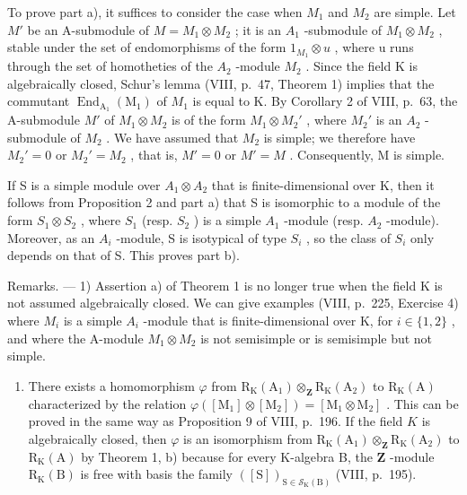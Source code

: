 To prove part a), it suffices to consider the case when \(M_{1}\) and \(M_{2}\) are simple. Let \(M'\) be an A-submodule of \(M = M_{1} \otimes M_{2}\) ; it is an \(A_{1}\) -submodule of \(M_{1} \otimes M_{2}\) , stable under the set of endomorphisms of the form \(1_{M_{1}} \otimes u\) , where u runs through the set of homotheties of the \(A_{2}\) -module \(M_{2}\) . Since the field K is algebraically closed, Schur's lemma (VIII, p.~47, Theorem 1) implies that the commutant \(\operatorname{End}_{\mathrm{A}_{1}}(\mathrm{M}_{1})\) of \(M_{1}\) is equal to K. By Corollary 2 of VIII, p.~63, the A-submodule \(M'\) of \(M_{1} \otimes M_{2}\) is of the form \(M_{1} \otimes M_{2}'\) , where \(M_{2}'\) is an \(A_{2}\) -submodule of \(M_{2}\) . We have assumed that \(M_{2}\) is simple; we therefore have \(M_{2}' = 0\) or \(M_{2}' = M_{2}\) , that is, \(M' = 0\) or \(M' = M\) . Consequently, M is simple.

If S is a simple module over \(A_{1} \otimes A_{2}\) that is finite-dimensional over K, then it follows from Proposition 2 and part a) that S is isomorphic to a module of the form \(S_{1} \otimes S_{2}\) , where \(S_{1}\) (resp. \(S_{2}\) ) is a simple \(A_{1}\) -module (resp. \(A_{2}\) -module). Moreover, as an \(A_{i}\) -module, S is isotypical of type \(S_{i}\) , so the class of \(S_{i}\) only depends on that of S. This proves part b).

Remarks. --- 1) Assertion a) of Theorem 1 is no longer true when the field K is not assumed algebraically closed. We can give examples (VIII, p.~225, Exercise 4) where \(M_{i}\) is a simple \(A_{i}\) -module that is finite-dimensional over K, for \(i \in \{1, 2\}\) , and where the A-module \(M_{1} \otimes M_{2}\) is not semisimple or is semisimple but not simple.

\begin{enumerate}
\def\labelenumi{\arabic{enumi})}
\setcounter{enumi}{1}
\tightlist
\item
  There exists a homomorphism \(\varphi\) from \(\mathrm{R_K(A_1)\otimes_{\mathbf{Z}} R_K(A_2)}\) to \(\mathrm{R_K(A)}\) characterized by the relation \(\varphi ([\mathrm{M}_1]\otimes [\mathrm{M}_2]) = [\mathrm{M}_1\otimes \mathrm{M}_2]\) . This can be proved in the same way as Proposition 9 of VIII, p.~196. If the field \(K\) is algebraically closed, then \(\varphi\) is an isomorphism from \(\mathrm{R_K(A_1)\otimes_{\mathbf{Z}} R_K(A_2)}\) to \(\mathrm{R_K(A)}\) by Theorem 1, b) because for every K-algebra B, the \(\mathbf{Z}\) -module \(\mathrm{R_K(B)}\) is free with basis the family \(([\mathrm{S}])_{\mathrm{S}\in \mathcal{S}_{\mathrm{K}}(\mathrm{B})}\) (VIII, p.~195).
\end{enumerate}

